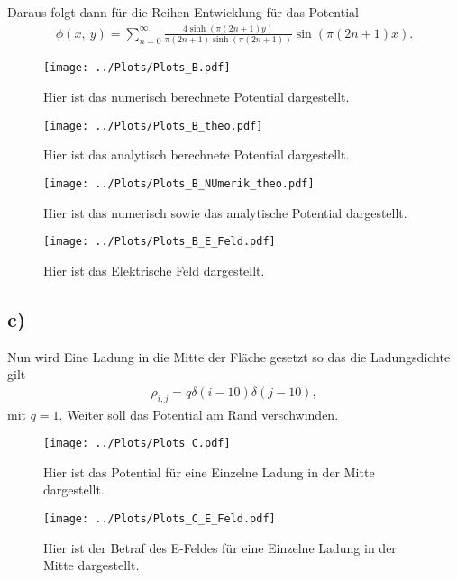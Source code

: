 Daraus folgt dann für die Reihen Entwicklung für das Potential
\begin{align}
	\phi(x,\ y)=\sum\limits_{n=0}^{\infty}\frac{4\sinh(\pi (2n+1)y)}{\pi(2n+1)\sinh(\pi(2n+1))}\sin(\pi(2n+1)x).
\end{align} 
\begin{figure}[h!]
	\centering
	\texttt{[image: ../Plots/Plots\_B.pdf]}
	\caption{Hier ist das numerisch berechnete Potential dargestellt.}
\end{figure}
\begin{figure}[h!]
	\centering
	\texttt{[image: ../Plots/Plots\_B\_theo.pdf]}
	\caption{Hier ist das analytisch berechnete Potential dargestellt.}
\end{figure}
\begin{figure}[h!]
	\centering
	\texttt{[image: ../Plots/Plots\_B\_NUmerik\_theo.pdf]}
	\caption{Hier ist das numerisch sowie das analytische Potential dargestellt.}
\end{figure}
\begin{figure}[h!]
	\centering
	\texttt{[image: ../Plots/Plots\_B\_E\_Feld.pdf]}
	\caption{Hier ist das Elektrische Feld dargestellt.}
\end{figure}
\newpage
\vspace*{5cm}
\newpage
\subsection*{c)}
Nun wird Eine Ladung in die Mitte der Fläche gesetzt so das die Ladungsdichte gilt 
\begin{align}
	\rho_{i,j}=q\delta(i-10)\delta(j-10),
\end{align}
mit $q=1$.
Weiter soll das Potential am Rand verschwinden.
\begin{figure}[h!]
	\centering
	\texttt{[image: ../Plots/Plots\_C.pdf]}
	\caption{Hier ist das Potential für eine Einzelne Ladung in der Mitte dargestellt.}
\end{figure}
\begin{figure}[h!]
	\centering
	\texttt{[image: ../Plots/Plots\_C\_E\_Feld.pdf]}
	\caption{Hier ist der Betraf des E-Feldes für eine Einzelne Ladung in der Mitte dargestellt.}
\end{figure}
